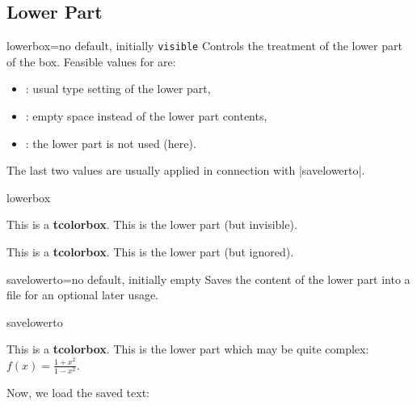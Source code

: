 \subsection{Lower Part}
\begin{docTcbKey}{lowerbox}{=}{no default, initially \texttt{visible}}
  Controls the treatment of the lower part of the box.
  Feasible values for  are:
  \begin{itemize}
  \item{}: usual type setting of the lower part,
  \item{}: empty space instead of the lower part contents,
  \item{}: the lower part is not used (here).
  \end{itemize}
  The last two values are usually applied in connection with |savelowerto|.
\begin{exdispExample}{lowerbox}
\begin{tcolorbox}[lowerbox=invisible,colback=white]
This is a \textbf{tcolorbox}.
\tcblower
This is the lower part (but invisible).
\end{tcolorbox}

\begin{tcolorbox}[lowerbox=ignored,colback=white]
This is a \textbf{tcolorbox}.
\tcblower
This is the lower part (but ignored).
\end{tcolorbox}
\end{exdispExample}
\end{docTcbKey}


\begin{docTcbKey}[][doc updated=2014-11-28]{savelowerto}{=}{no default, initially empty}
  Saves the content of the lower part into a file for an optional later usage.
\begin{exdispExample}{savelowerto}
\begin{tcolorbox}[lowerbox=invisible,savelowerto=\jobname_bspsave.tex,colback=white]
This is a \textbf{tcolorbox}.
\tcblower
This is the lower part which may be quite complex:
$\displaystyle f(x)=\frac{1+x^2}{1-x^2}$.
\end{tcolorbox}

Now, we load the saved text:\\

\end{exdispExample}
\end{docTcbKey}

